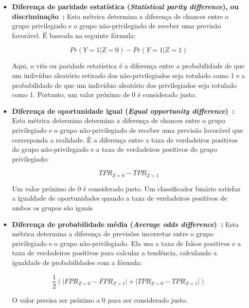 \documentclass[Portugues,Final]{ic-tese-v3}
\begin{document}
\begin{itemize}
\item \textbf{Diferença de paridade estatística (\textit{Statistical parity difference}), ou discriminação~\cite{Zemel_2013}:} Esta métrica determina a diferença de chances entre o grupo privilegiado e o grupo não-privilegiado de receber uma previsão favorável. É baseada na seguinte fórmula:

\begin{equation}
Pr(Y=1|Z=0)-Pr(Y=1|Z=1)
\end{equation}
 
Aqui, o viés ou paridade estatística é a diferença entre a probabilidade de que um indivíduo aleatório retirado dos não-privilegiados seja rotulado como 1 e a probabilidade de que um indivíduo aleatório dos privilegiados seja rotulado como 1. Portanto, um valor próximo de 0 é considerado justo.

\item \textbf{Diferença de oportunidade igual (\textit{Equal opportunity difference})~\cite{Biswas_2020}:} Esta métrica determina determina a diferença de chances entre o grupo privilegiado e o grupo não-privilegiado de receber uma previsão favorável que corresponda a realidade. É a diferença entre a taxa de verdadeiros positivos do grupo não-privilegiado e a taxa de verdadeiros positivos do grupo privilegiado:

\begin{equation}
TPR_{Z=0} - TPR_{Z=1}
\end{equation}
 
Um valor próximo de 0 é considerado justo. Um classificador binário satisfaz a igualdade de oportunidades quando a taxa de verdadeiros positivos de ambos os grupos são iguais~\cite{Hardt_2016}

\item \textbf{Diferença de probabilidade média (\textit{Average odds difference})~\cite{Biswas_2020}:} Esta métrica determina a diferença de previsões incorretas entre o grupo privilegiado e o grupo não-privilegiado. Ela usa a taxa de falsos positivos e a taxa de verdadeiros positivos para calcular a tendência, calculando a igualdade de probabilidades com a fórmula:

\begin{equation}
\frac{1}{2}(|FPR_{Z=0} - FPR_{Z=1}|+|TPR_{Z=0} - TPR_{Z=1}|)
\end{equation}
 
O valor precisa ser próximo a 0 para ser considerado justo.


\end{itemize}
\end{document}
